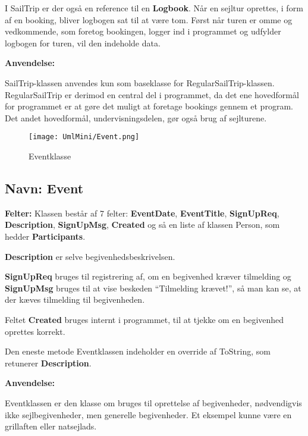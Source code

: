 I SailTrip er der også en reference til en \textbf{Logbook}.
Når en sejltur oprettes, i form af en booking, bliver logbogen sat til at være tom.
Først når turen er omme og vedkommende, som foretog bookingen, logger ind i programmet og udfylder logbogen for turen, vil den indeholde data.

\textbf{Anvendelse:}

SailTrip-klassen anvendes kun som baseklasse for RegularSailTrip-klassen. 
RegularSailTrip er derimod en central del i programmet, da det ene hovedformål for programmet er at gøre det muligt at foretage bookings gennem et program. Det andet hovedformål, undervisningsdelen, gør også brug af sejlturene. 

\begin{wrapfigure}[10]{R}{0.5\textwidth}
    \label{img:login_interface}
    \vspace{-20pt}
    \begin{center}
        \texttt{[image: UmlMini/Event.png]}
    \end{center}
    \vspace{-20pt}
    \caption{Eventklasse}
\end{wrapfigure}

\subsection*{Navn: Event}

\textbf{Felter:}
Klassen består af 7 felter: \textbf{EventDate}, \textbf{EventTitle}, \textbf{SignUpReq}, \textbf{Description}, \textbf{SignUpMsg}, \textbf{Created} og så en liste af klassen Person, som hedder \textbf{Participants}.

\textbf{Description} er selve begivenhedsbeskrivelsen. 

\textbf{SignUpReq} bruges til registrering af, om en begivenhed kræver tilmelding og \textbf{SignUpMsg} bruges til at vise beskeden ``Tilmelding krævet!'', så man kan se, at der kæves tilmelding til begivenheden. 

Feltet \textbf{Created} bruges internt i programmet, til at tjekke om en begivenhed oprettes korrekt.

Den eneste metode Eventklassen indeholder en override af ToString, som retunerer \textbf{Description}.

\textbf{Anvendelse:}

Eventklassen er den klasse om bruges til oprettelse af  begivenheder, nødvendigvis ikke sejlbegivenheder, men generelle begivenheder. Et eksempel kunne være en grillaften eller natsejlads.

